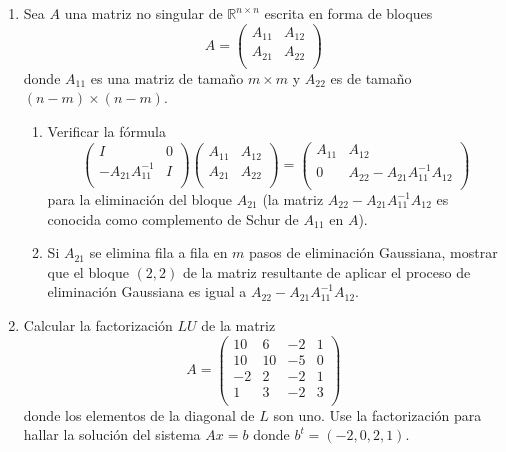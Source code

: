 \documentclass[12pt,letterpaper]{article}
\theoremstyle{plain}
\begin{document}
\begin{enumerate}
\item Sea $A$ una matriz no singular de $\mathbb{R}^{n\times n}$ escrita en forma de bloques
$$
A=\left( \begin{array}{cc}
         A_{11}   & A_{12} \\
         A_{21} & A_{22} \\
        \end{array}\right)
$$
donde $A_{11}$ es una matriz de tama\~no $m\times m$ y $A_{22}$ es de tama\~no $(n-m)\times(n-m)$.
\begin{enumerate}
\item Verificar la f\'ormula
$$
\left( \begin{array}{cc}
         I   & 0 \\
         -A_{21}A_{11}^{-1} & I \\
        \end{array}\right)\left( \begin{array}{cc}
         A_{11}   & A_{12} \\
         A_{21} & A_{22} \\
        \end{array}\right)=\left( \begin{array}{cc}
         A_{11}   & A_{12} \\
         0 & A_{22} - A_{21}A_{11}^{-1}A_{12} \\
        \end{array}\right)
$$
para la eliminaci\'on del bloque $A_{21}$ (la matriz $A_{22} - A_{21}A_{11}^{-1}A_{12}$ es conocida como complemento de Schur de $A_{11}$ en $A$).
\item Si $A_{21}$ se elimina fila a fila en $m$ pasos de eliminaci\'on Gaussiana, mostrar que el bloque $(2,2)$ de la matriz resultante de aplicar el proceso de eliminaci\'on Gaussiana es igual a $A_{22} - A_{21}A_{11}^{-1}A_{12}$.

\end{enumerate}

\item Calcular la factorizaci\'on $LU$ de la matriz
$$
A=\left( \begin{array}{cccc}
         10 & 6 & -2 & 1\\
         10 & 10 & -5 & 0\\
         -2 & 2 & -2 & 1\\
	      1 & 3 & -2 & 3\\
        \end{array}\right)
$$
donde los elementos de la diagonal de $L$ son uno. Use la factorizaci\'on para hallar la soluci\'on del sistema $Ax=b$ donde $b^t=(-2,0,2,1)$.


\end{enumerate}
\end{document}
